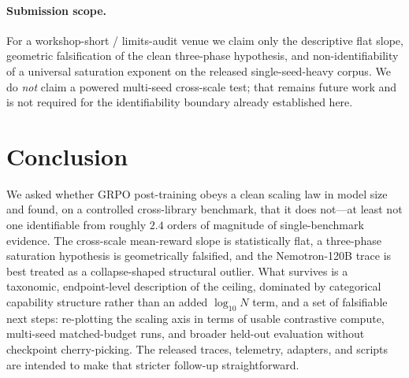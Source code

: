 \documentclass{article}
\begin{document}
\paragraph{Submission scope.}
For a workshop-short / limits-audit venue we claim only the descriptive flat
slope, geometric falsification of the clean three-phase hypothesis, and
non-identifiability of a universal saturation exponent on the released
single-seed-heavy corpus. We do \emph{not} claim a powered multi-seed
cross-scale test; that remains future work and is not required for the
identifiability boundary already established here.

\section{Conclusion}
\label{sec:p1-conclusion}
We asked whether GRPO post-training obeys a clean scaling law in model size and
found, on a controlled cross-library benchmark, that it does not---at least not
one identifiable from roughly $2.4$ orders of magnitude of single-benchmark evidence. The
cross-scale mean-reward slope is statistically flat, a three-phase saturation
hypothesis is geometrically falsified, and the Nemotron-120B trace is best treated
as a collapse-shaped structural outlier. What survives is a taxonomic, endpoint-level
description of the ceiling, dominated by categorical capability structure rather
than an added $\log_{10} N$ term, and a set of falsifiable next steps:
re-plotting the scaling axis in terms of usable contrastive compute, multi-seed
matched-budget runs, and broader held-out evaluation without checkpoint
cherry-picking. The released traces, telemetry, adapters, and scripts are intended to make
that stricter follow-up straightforward.
 

\end{document}

